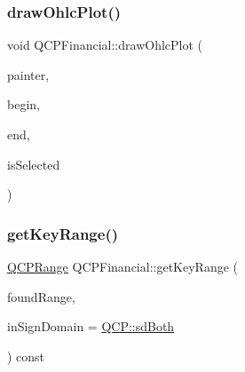 \subsubsection{\texorpdfstring{draw\+Ohlc\+Plot()}{drawOhlcPlot()}}
{\footnotesize\ttfamily void Q\+C\+P\+Financial\+::draw\+Ohlc\+Plot (\begin{DoxyParamCaption}\item[{\hyperlink{class_q_c_p_painter}{Q\+C\+P\+Painter} $\ast$}]{painter,  }\item[{const \hyperlink{class_q_c_p_data_container_ae40a91f5cb0bcac61d727427449b7d15}{Q\+C\+P\+Financial\+Data\+Container\+::const\+\_\+iterator} \&}]{begin,  }\item[{const \hyperlink{class_q_c_p_data_container_ae40a91f5cb0bcac61d727427449b7d15}{Q\+C\+P\+Financial\+Data\+Container\+::const\+\_\+iterator} \&}]{end,  }\item[{bool}]{is\+Selected }\end{DoxyParamCaption})\hspace{0.3cm}{\ttfamily [protected]}}

\mbox{\label{class_q_c_p_financial_a15d68fb257113fef697356d65fa76559}} 
\subsubsection{\texorpdfstring{get\+Key\+Range()}{getKeyRange()}}
{\footnotesize\ttfamily \hyperlink{class_q_c_p_range}{Q\+C\+P\+Range} Q\+C\+P\+Financial\+::get\+Key\+Range (\begin{DoxyParamCaption}\item[{bool \&}]{found\+Range,  }\item[{\hyperlink{namespace_q_c_p_afd50e7cf431af385614987d8553ff8a9}{Q\+C\+P\+::\+Sign\+Domain}}]{in\+Sign\+Domain = {\ttfamily \hyperlink{namespace_q_c_p_afd50e7cf431af385614987d8553ff8a9aa38352ef02d51ddfa4399d9551566e24}{Q\+C\+P\+::sd\+Both}} }\end{DoxyParamCaption}) const\hspace{0.3cm}{\ttfamily [virtual]}}

